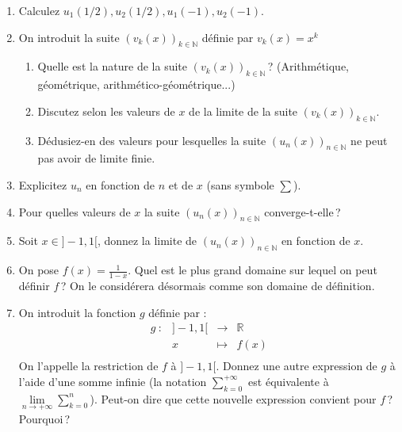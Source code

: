 \documentclass[10pt,a4paper]{article}
\begin{document}
\begin{enumerate}
\item Calculez $u_1(1/2), u_2(1/2), u_1(-1), u_2(-1)$.
\item On introduit la suite $(v_k(x))_{k \in \mathbb{N}}$ définie par $v_k(x)=x^k$
\begin{enumerate}
\item Quelle est la nature de la suite $(v_k(x))_{k \in \mathbb{N}}$\,? (Arithmétique, géométrique, arithmético-géométrique...)
\item Discutez selon les valeurs de $x$ de la limite de la suite $(v_k(x))_{k \in \mathbb{N}}$.
\item Dédusiez-en des valeurs pour lesquelles la suite $(u_n(x))_{n \in \mathbb{N}}$ ne peut pas avoir de limite finie.
\end{enumerate}
\item Explicitez $u_n$ en fonction de $n$ et de $x$ (sans symbole $\sum$).
\item Pour quelles valeurs de $x$ la suite $(u_n(x))_{n\in\mathbb{N}}$ converge-t-elle\,?
\item Soit $x \in ]-1,1[$, donnez la limite de $(u_n(x))_{n\in\mathbb{N}}$ en fonction de $x$.
\item On pose $f(x)=\frac{1}{1-x}$. Quel est le plus grand domaine sur lequel on peut définir $f$\,? On le considérera désormais comme son
domaine de définition.
\item On introduit la fonction $g$ définie par :
$$\begin{array}{ccccc}
g ~:& ]-1,1[ & \longrightarrow & \mathbb{R} \\
& x & \longmapsto & f(x) \\
\end{array}$$
On l'appelle la restriction de $f$ à $]-1,1[$. Donnez une autre expression de $g$ à l'aide d'une somme infinie (la notation $\sum\limits_{k=0}^{+\infty}$ est 
équivalente à $\lim\limits_{n\to+\infty}\sum\limits_{k=0}^n$). Peut-on dire que cette nouvelle
expression convient pour $f$\,? Pourquoi\,?
\end{enumerate}
\end{document}
